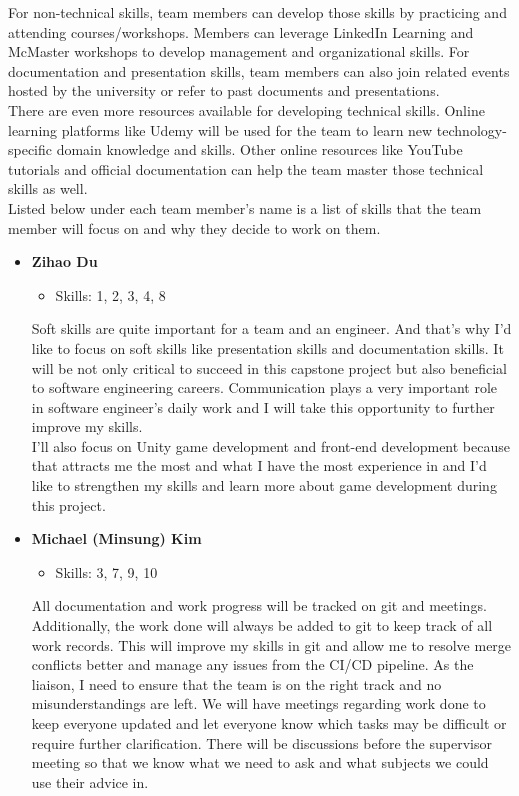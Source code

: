 \documentclass[12pt]{article}
\begin{document}
\begin{enumerate}
  
\quad For non-technical skills, team members can develop those skills by practicing and attending courses/workshops. Members can leverage LinkedIn Learning and McMaster workshops to develop management and organizational skills. For documentation and presentation skills, team members can also join related events hosted by the university or refer to past documents and presentations.\\
  There are even more resources available for developing technical skills. Online learning platforms like Udemy will be used for the team to learn new technology-specific domain knowledge and skills. Other online resources like YouTube tutorials and official documentation can help the team master those technical skills as well.\\
  Listed below under each team member's name is a list of skills that the team member will focus on and why they decide to work on them.\\
\begin{itemize}
      \item \textbf{Zihao Du}
      \begin{itemize}
          \item Skills: 1, 2, 3, 4, 8
      \end{itemize}
      Soft skills are quite important for a team and an engineer. And that's why I'd like to focus on soft skills like presentation skills and documentation skills. It will be not only critical to succeed in this capstone project but also beneficial to software engineering careers. Communication plays a very important role in software engineer's daily work and I will take this opportunity to further improve my skills.\\
      I'll also focus on Unity game development and front-end development because that attracts me the most and what I have the most experience in and I'd like to strengthen my skills and learn more about game development during this project.
    \item \textbf{Michael (Minsung) Kim}
        \begin{itemize}
          \item Skills: 3, 7, 9, 10
        \end{itemize}
        All documentation and work progress will be tracked on git and meetings. Additionally, the work done will always be added to git to keep track of all work records. This will improve my skills in git and allow me to resolve merge conflicts better and manage any issues from the CI/CD pipeline. As the liaison, I need to ensure that the team is on the right track and no misunderstandings are left. We will have meetings regarding work done to keep everyone updated and let everyone know which tasks may be difficult or require further clarification. There will be discussions before the supervisor meeting so that we know what we need to ask and what subjects we could use their advice in. \\

\end{itemize}
\end{enumerate}
\end{document}
